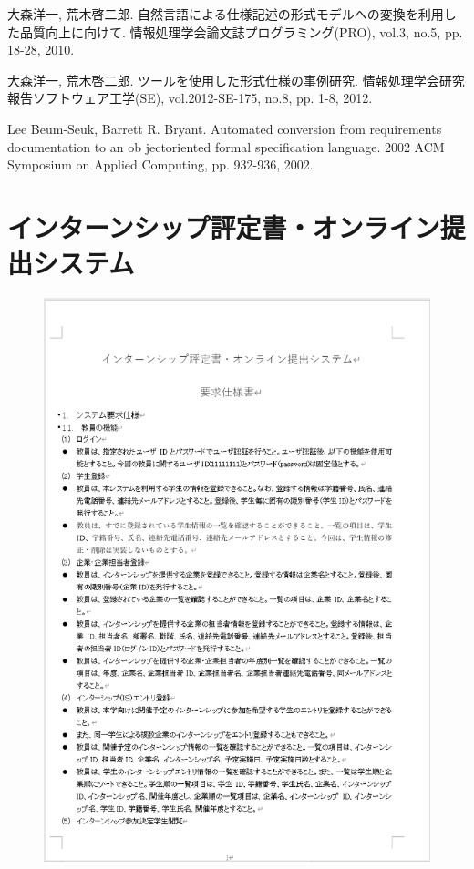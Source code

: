 \documentclass[uplatex, report, a4j, 10pt]{jsbook}
\begin{document}
\begin{thebibliography}{10}
    大森洋一, 荒木啓二郎. 
    自然言語による仕様記述の形式モデルへの変換を利用した品質向上に向けて. 
    情報処理学会論文誌プログラミング(PRO), 
    vol.3, no.5, pp. 18-28, 2010.

    大森洋一, 荒木啓二郎. 
    ツールを使用した形式仕様の事例研究. 
    情報処理学会研究報告ソフトウェア工学(SE), 
    vol.2012-SE-175, no.8, pp. 1-8, 2012.

    Lee Beum-Seuk, Barrett R. Bryant. 
    Automated conversion from requirements documentation to an ob jectoriented formal specification language. 
    2002 ACM Symposium on Applied Computing, pp. 932-936, 2002.

\end{thebibliography}

\appendix  %

\chapter{インターンシップ評定書・オンライン提出システム}\label{ET_Specifications}

\begin{figure}[tp]
    \begin{center}
    \includegraphics[width=\hsize]{specification/internship_1.eps}
    \end{center}
\end{figure}
\end{document}
